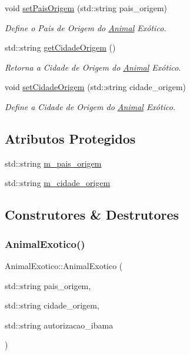 \begin{DoxyCompactItemize}
void \hyperlink{classAnimalExotico_a2077371fdd8e779a42451a9183d14c63}{set\+Pais\+Origem} (std\+::string pais\+\_\+origem)
\begin{DoxyCompactList}\small\item\em Define o Pais de Origem do \hyperlink{classAnimal}{Animal} Exótico. \end{DoxyCompactList}\item 
std\+::string \hyperlink{classAnimalExotico_a3b9a4a0366f253bf06befa65754d38a3}{get\+Cidade\+Origem} ()
\begin{DoxyCompactList}\small\item\em Retorna a Cidade de Origem do \hyperlink{classAnimal}{Animal} Exótico. \end{DoxyCompactList}\item 
void \hyperlink{classAnimalExotico_abee9fb2e0bfd567a8a0fcb302cf944db}{set\+Cidade\+Origem} (std\+::string cidade\+\_\+origem)
\begin{DoxyCompactList}\small\item\em Define a Cidade de Origem do \hyperlink{classAnimal}{Animal} Exótico. \end{DoxyCompactList}\end{DoxyCompactItemize}
\subsection*{Atributos Protegidos}
\begin{DoxyCompactItemize}
\item 
std\+::string \hyperlink{classAnimalExotico_a5a00f07c9cd9f11baadef0282eaad031}{m\+\_\+pais\+\_\+origem}
\item 
std\+::string \hyperlink{classAnimalExotico_a99e6ec9acb3106efc101a828f645c1dc}{m\+\_\+cidade\+\_\+origem}
\end{DoxyCompactItemize}


\subsection{Construtores \& Destrutores}
\mbox{\label{classAnimalExotico_a3840065be138c7820007d1c2d33272c3}} 
\subsubsection{\texorpdfstring{Animal\+Exotico()}{AnimalExotico()}}
{\footnotesize\ttfamily Animal\+Exotico\+::\+Animal\+Exotico (\begin{DoxyParamCaption}\item[{std\+::string}]{pais\+\_\+origem,  }\item[{std\+::string}]{cidade\+\_\+origem,  }\item[{std\+::string}]{autorizacao\+\_\+ibama }\end{DoxyParamCaption})}




